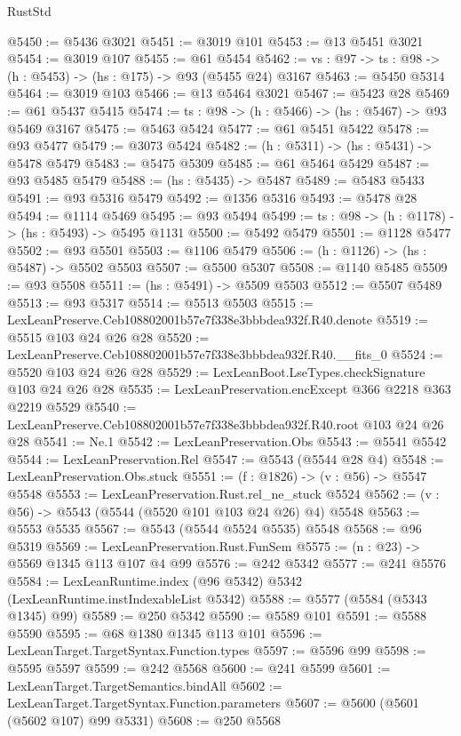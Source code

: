 \begin{lexlean}{RustStd}
\begin{coremodule}
@5450 := @5436 @3021
@5451 := @3019 @101
@5453 := @13 @5451 @3021
@5454 := @3019 @107
@5455 := @61 @5454
@5462 := {vs : @97} -> {ts : @98} -> (h : @5453) -> (hs : @175) -> @93 (@5455 @24) @3167
@5463 := @5450 @5314
@5464 := @3019 @103
@5466 := @13 @5464 @3021
@5467 := @5423 @28
@5469 := @61 @5437 @5415
@5474 := {ts : @98} -> (h : @5466) -> (hs : @5467) -> @93 @5469 @3167
@5475 := @5463 @5424
@5477 := @61 @5451 @5422
@5478 := @93 @5477
@5479 := @3073 @5424
@5482 := (h : @5311) -> (hs : @5431) -> @5478 @5479
@5483 := @5475 @5309
@5485 := @61 @5464 @5429
@5487 := @93 @5485 @5479
@5488 := (hs : @5435) -> @5487
@5489 := @5483 @5433
@5491 := @93 @5316 @5479
@5492 := @1356 @5316
@5493 := @5478 @28
@5494 := @1114 @5469
@5495 := @93 @5494
@5499 := {ts : @98} -> (h : @1178) -> (hs : @5493) -> @5495 @1131
@5500 := @5492 @5479
@5501 := @1128 @5477
@5502 := @93 @5501
@5503 := @1106 @5479
@5506 := (h : @1126) -> (hs : @5487) -> @5502 @5503
@5507 := @5500 @5307
@5508 := @1140 @5485
@5509 := @93 @5508
@5511 := (hs : @5491) -> @5509 @5503
@5512 := @5507 @5489
@5513 := @93 @5317
@5514 := @5513 @5503
@5515 := LexLeanPreserve.Ceb108802001b57e7f338e3bbbdea932f.R40.denote
@5519 := @5515 @103 @24 @26 @28
@5520 := LexLeanPreserve.Ceb108802001b57e7f338e3bbbdea932f.R40.__fits_0
@5524 := @5520 @103 @24 @26 @28
@5529 := LexLeanBoot.LseTypes.checkSignature @103 @24 @26 @28
@5535 := LexLeanPreservation.encExcept @366 @2218 @363 @2219 @5529
@5540 := LexLeanPreserve.Ceb108802001b57e7f338e3bbbdea932f.R40.root @103 @24 @26 @28
@5541 := Ne.{1}
@5542 := LexLeanPreservation.Obs
@5543 := @5541 @5542
@5544 := LexLeanPreservation.Rel
@5547 := @5543 (@5544 @28 @4)
@5548 := LexLeanPreservation.Obs.stuck
@5551 := (f : @1826) -> (v : @56) -> @5547 @5548
@5553 := LexLeanPreservation.Rust.rel_ne_stuck @5524
@5562 := (v : @56) -> @5543 (@5544 (@5520 @101 @103 @24 @26) @4) @5548
@5563 := @5553 @5535
@5567 := @5543 (@5544 @5524 @5535) @5548
@5568 := @96 @5319
@5569 := LexLeanPreservation.Rust.FunSem
@5575 := (n : @23) -> @5569 @1345 @113 @107 @4 @99
@5576 := @242 @5342
@5577 := @241 @5576
@5584 := LexLeanRuntime.index (@96 @5342) @5342 (LexLeanRuntime.instIndexableList @5342)
@5588 := @5577 (@5584 (@5343 @1345) @99)
@5589 := @250 @5342
@5590 := @5589 @101
@5591 := @5588 @5590
@5595 := @68 @1380 @1345 @113 @101
@5596 := LexLeanTarget.TargetSyntax.Function.types
@5597 := @5596 @99
@5598 := @5595 @5597
@5599 := @242 @5568
@5600 := @241 @5599
@5601 := LexLeanTarget.TargetSemantics.bindAll
@5602 := LexLeanTarget.TargetSyntax.Function.parameters
@5607 := @5600 (@5601 (@5602 @107) @99 @5331)
@5608 := @250 @5568

\end{coremodule}
\end{lexlean}
